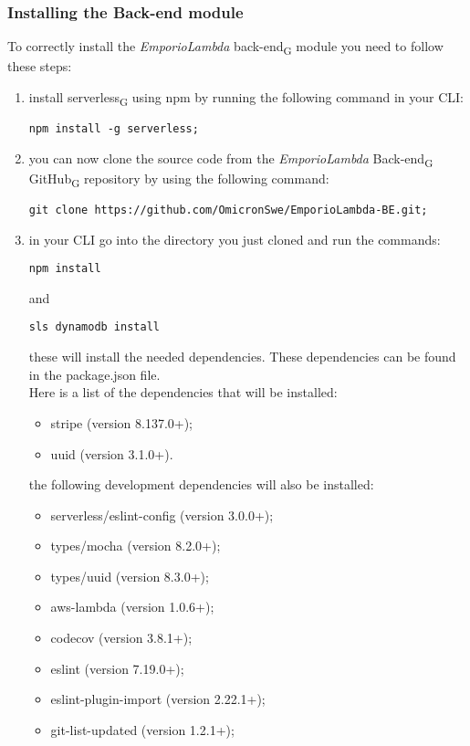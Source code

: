 \subsubsection{Installing the Back-end module}
To correctly install the \textit{EmporioLambda} back-end\textsubscript{G} module you need to follow these steps:
\begin{enumerate}
\item install serverless\textsubscript{G} using npm by running the following command in your CLI:\begin{center}
\texttt{npm install -g serverless;}
\end{center}
\item you can now clone the source code from the \textit{EmporioLambda} Back-end\textsubscript{G} GitHub\textsubscript{G} repository by using the following command:
\begin{center}
\texttt{git clone https://github.com/OmicronSwe/EmporioLambda-BE.git;}
\end{center}
\item in your CLI go into the directory you just cloned and run the commands:
\begin{center}
\texttt{npm install}
\end{center}
and
\begin{center}
\texttt{sls dynamodb install}
\end{center}
these will install the needed dependencies. These dependencies can be found in the package.json file.\\Here is a list of the dependencies that will be installed:
\begin{itemize}
\item stripe (version 8.137.0+);
\item uuid (version 3.1.0+).
\end{itemize}
the following development dependencies will also be installed:
\begin{itemize}
\item serverless/eslint-config (version 3.0.0+);
\item types/mocha (version 8.2.0+);
\item types/uuid (version 8.3.0+);
\item aws-lambda (version 1.0.6+);
\item codecov (version 3.8.1+);
\item eslint (version 7.19.0+);
\item eslint-plugin-import (version 2.22.1+);
\item git-list-updated (version 1.2.1+);

\end{itemize}
\end{enumerate}
